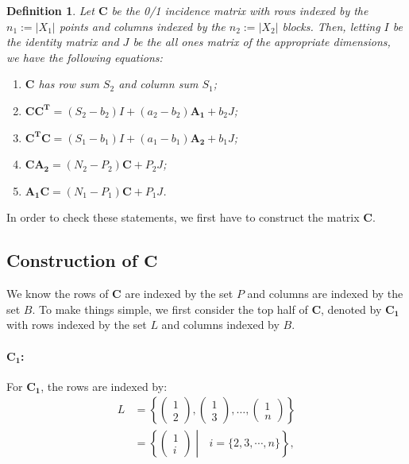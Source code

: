 \documentclass{article}
\newtheorem{definition}{Definition}
\begin{document}
\begin{definition}
    Let \(\mathbf{C}\) be the 0/1 incidence matrix with rows indexed by the \(n_1 := |X_1|\) points and columns indexed by the \(n_2 := |X_2|\) blocks. Then, letting \(I\) be the identity matrix and \(J\) be the all ones matrix of the appropriate dimensions, we have the following equations:
    \begin{enumerate}
        \item \(\mathbf{C}\) has row sum \(S_2\) and column sum \(S_1\);
        \item \(\mathbf{CC^T} = (S_2-b_2)I + (a_2 - b_2)\mathbf{A_1} +b_2J\);
        \item \(\mathbf{C^T C} = (S_1-b_1)I + (a_1-b_1)\mathbf{A_2}+b_1J\);
        \item \(\mathbf{CA_2} = (N_2-P_2)\mathbf{C}+P_2J\);
        \item \(\mathbf{A_1C} = (N_1-P_1)\mathbf{C}+P_1J\).
    \end{enumerate}
\end{definition}

In order to check these statements, we first have to construct the matrix \(\mathbf{C}\).

\subsection{Construction of \( \mathbf{C} \)}
We know the rows of \(\mathbf{C}\) are indexed by the set \(P\) and columns are indexed by the set \(B\). To make things simple, we first consider the top half of \(\mathbf{C}\), denoted by \(\mathbf{C_1}\) with rows indexed by the set \(L\) and columns indexed by \(B\).

\paragraph{\( \mathbf{C_1} \):}

For \( \mathbf{C_1} \), the rows are indexed by:
\begin{align*}
    L &= \left\{\begin{pmatrix} 1 \\ 2 \end{pmatrix}, \begin{pmatrix} 1 \\ 3 \end{pmatrix}, \dots, \begin{pmatrix} 1 \\ n \end{pmatrix}\right\} \\
    &= \left\{ \begin{pmatrix}1 \\ i\end{pmatrix}\middle|\text{ }i=\{2,3,\cdots,n\}\right\},
\end{align*}
\end{document}
